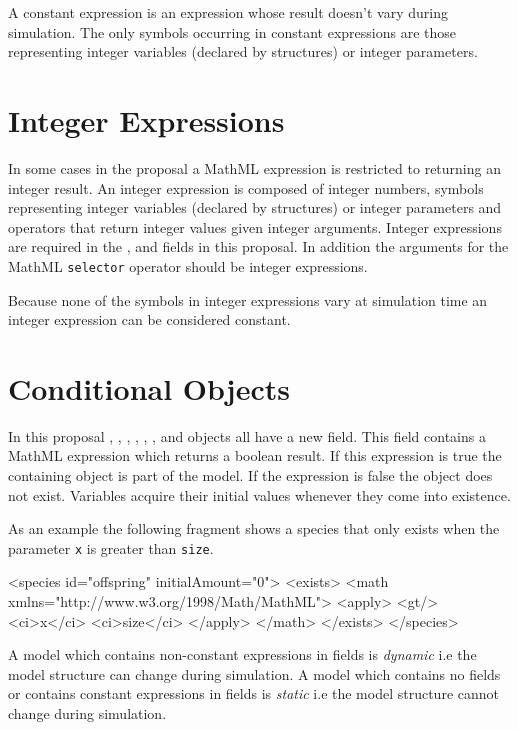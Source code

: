 \documentclass{cekarticle}
\begin{document}
A constant expression is an expression whose result doesn't vary during simulation.
The only symbols occurring in constant expressions are those representing integer variables (declared by  structures)
or integer parameters.

\section{Integer Expressions}
\label{sec:integerExpressions}

In some cases in the proposal a MathML expression is restricted to returning an integer result.
An integer expression is composed of integer numbers, symbols representing integer variables (declared by  structures)
or integer parameters and
operators that return integer values given integer arguments.  Integer expressions are required in the
,  and  fields in this proposal. In addition the arguments for the
MathML \texttt{selector} operator should be integer expressions.

Because none of the symbols in integer expressions vary at simulation time an integer expression can be considered constant.

\section{Conditional Objects}
\label{sec:exists}
In this proposal , , , , , ,  and 
objects all have a new  field.  This field contains a MathML expression which returns a boolean result.  If this expression
is true the containing object is part of the model.  If the expression is false the object does not exist.  Variables acquire their initial values
whenever they come into existence.

As an example the following fragment shows a species that only exists when the parameter \texttt{x} is greater than \texttt{size}. 
\pagebreak
\begin{example}
<species id="offspring" initialAmount="0">
    <exists>
        <math xmlns="http://www.w3.org/1998/Math/MathML">
            <apply>
                <gt/>
                <ci>x</ci>
                <ci>size</ci>
            </apply>
        </math>
    </exists>
</species>
\end{example}

A model which contains non-constant expressions in
 fields is \emph{dynamic} i.e the model structure can change during simulation.  A model which contains no  fields or
contains constant expressions in  fields is \emph{static} i.e the model structure cannot change during simulation.
\end{document}
